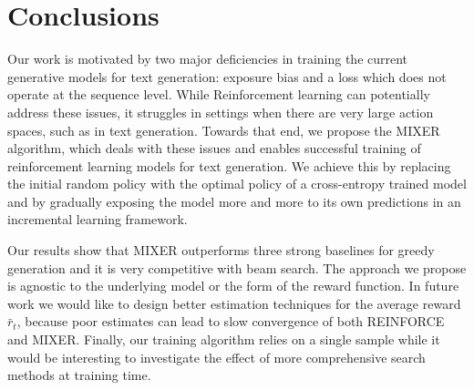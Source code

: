 \section{Conclusions}

Our work is motivated by two major deficiencies in training the current generative models for text generation: exposure bias and a loss which does not operate at the sequence level.
While Reinforcement learning can potentially address these issues, it struggles in settings when 
there are very large action spaces, such as in text generation. Towards that end, 
we propose the MIXER algorithm, which deals with these issues and enables successful training of reinforcement learning models for text generation. 
We achieve this by replacing the initial random policy with the optimal policy of a cross-entropy trained model and by gradually exposing the model more and more to its own predictions in an incremental learning framework.






Our results show that MIXER outperforms three strong baselines for greedy generation and it is very competitive with beam search. 
The approach we propose is agnostic to the underlying model or the form of the reward function. 
In future work we would like to design better estimation techniques for the average reward $\bar{r}_t$, because poor estimates can lead to slow convergence of both REINFORCE and MIXER. 
Finally, our training algorithm relies on a single sample while it would be interesting to investigate the effect of more comprehensive search methods at training time.


